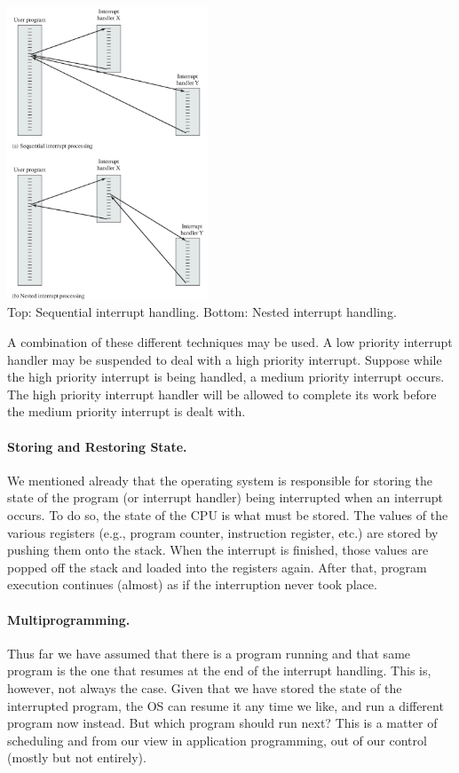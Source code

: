 \documentclass[a4paper]{report}
\begin{document}
\begin{center}
	\includegraphics[width=0.45\textwidth]{images/interrupts.png}\\
	Top: Sequential interrupt handling. Bottom: Nested interrupt handling.~\cite{osi}
\end{center}

A combination of these different techniques may be used. A low priority interrupt handler may be suspended to deal with a high priority interrupt. Suppose while the high priority interrupt is being handled, a medium priority interrupt occurs. The high priority interrupt handler will be allowed to complete its work before the medium priority interrupt is dealt with.

\paragraph{Storing and Restoring State.} We mentioned already that the operating system is responsible for storing the state of the program (or interrupt handler) being interrupted when an interrupt occurs. To do so, the state of the CPU is what must be stored. The values of the various registers (e.g., program counter, instruction register, etc.) are stored by pushing them onto the stack. When the interrupt is finished, those values are popped off the stack and loaded into the registers again. After that, program execution continues (almost) as if the interruption never took place.

\paragraph{Multiprogramming.} Thus far we have assumed that there is a program running and that same program is the one that resumes at the end of the interrupt handling. This is, however, not always the case. Given that we have stored the state of the interrupted program, the OS can resume it any time we like, and run a different program now instead. But which program should run next? This is a matter of scheduling and from our view in application programming, out of our control (mostly but not entirely).
\end{document}
